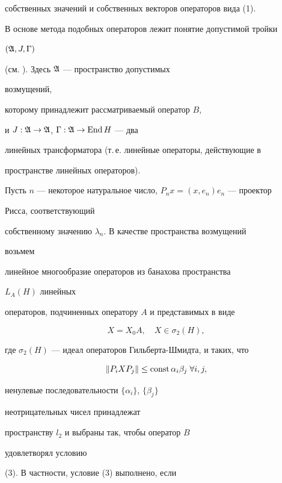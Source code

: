 собственных значений и собственных векторов операторов вида (1).





В основе метода подобных операторов лежит понятие допустимой тройки


$(\frak A,J,\Gamma)$


(см. \cite{Bas2}). Здесь $\frak A$ --- пространство допустимых


возмущений,


которому принадлежит рассматриваемый оператор $B$,


и $J:\frak A\to\frak A$, $\Gamma:\frak A\to\operatorname{End} H$ --- два


линейных трансформатора (т.\,е. линейные операторы, действующие в


пространстве линейных операторов).





Пусть $n$ --- некоторое натуральное число, $P_nx=(x,e_n)e_n$ --- проектор


Рисса, соответствующий


собственному значению $\lambda_n$. В качестве пространства возмущений


возьмем


линейное многообразие операторов из банахова пространства


$L_A(H)$ линейных


операторов, подчиненных оператору $A$ и представимых в виде


\begin{equation}


X=X_0A,\quad X\in\sigma_2(H),


\end{equation}


где $\sigma_2(H)$ --- идеал операторов Гильберта-Шмидта, и таких, что


\begin{equation}


\|P_iXP_j\|\le \const\alpha_i\beta_j \; \forall i,j,


\end{equation}


ненулевые последовательности $\{\alpha_i\}$, $\{\beta_j\}$


неотрицательных чисел принадлежат


пространству $l_2$ и выбраны так, чтобы оператор $B$


удовлетворял условию


(3). В частности, условие (3) выполнено, если


